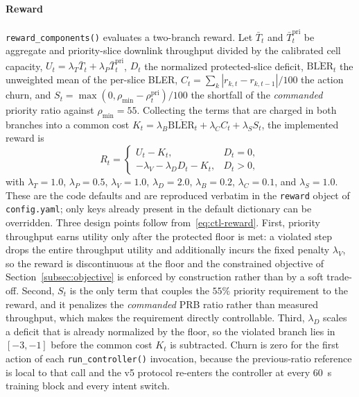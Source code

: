 \paragraph*{Reward}
\texttt{reward\_components()} evaluates a two-branch reward. Let $\bar T_t$ and $\bar T^{\mathrm{pri}}_t$ be aggregate and priority-slice downlink throughput divided by the calibrated cell capacity, $U_t=\lambda_T\bar T_t+\lambda_P\bar T^{\mathrm{pri}}_t$, $D_t$ the normalized protected-slice deficit, $\overline{\mathrm{BLER}}_t$ the unweighted mean of the per-slice BLER, $C_t=\sum_k|r_{k,t}-r_{k,t-1}|/100$ the action churn, and $S_t=\max(0,\rho_{\min}-\rho^{\mathrm{pri}}_t)/100$ the shortfall of the \emph{commanded} priority ratio against $\rho_{\min}=55$. Collecting the terms that are charged in both branches into a common cost $K_t=\lambda_B\overline{\mathrm{BLER}}_t+\lambda_C C_t+\lambda_S S_t$, the implemented reward is
\begin{equation}
R_t=
\begin{cases}
U_t-K_t, & D_t=0,\\[3pt]
-\lambda_V-\lambda_D D_t-K_t, & D_t>0,
\end{cases}
\label{eq:ctl-reward}
\end{equation}
with $\lambda_T=1.0$, $\lambda_P=0.5$, $\lambda_V=1.0$, $\lambda_D=2.0$, $\lambda_B=0.2$, $\lambda_C=0.1$, and $\lambda_S=1.0$. These are the code defaults and are reproduced verbatim in the \texttt{reward} object of \texttt{config.yaml}; only keys already present in the default dictionary can be overridden. Three design points follow from~\eqref{eq:ctl-reward}. First, priority throughput earns utility only after the protected floor is met: a violated step drops the entire throughput utility and additionally incurs the fixed penalty $\lambda_V$, so the reward is discontinuous at the floor and the constrained objective of Section~\ref{subsec:objective} is enforced by construction rather than by a soft trade-off. Second, $S_t$ is the only term that couples the $55\%$ priority requirement to the reward, and it penalizes the \emph{commanded} PRB ratio rather than measured throughput, which makes the requirement directly controllable. Third, $\lambda_D$ scales a deficit that is already normalized by the floor, so the violated branch lies in $[-3,-1]$ before the common cost $K_t$ is subtracted. Churn is zero for the first action of each \texttt{run\_controller()} invocation, because the previous-ratio reference is local to that call and the v5 protocol re-enters the controller at every $60$~s training block and every intent switch.

